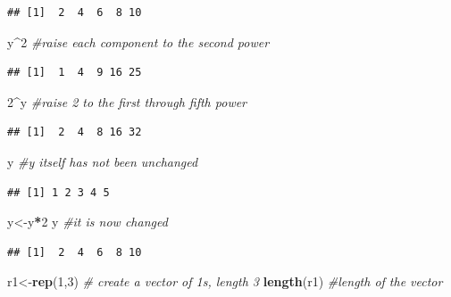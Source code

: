 \documentclass[12pt,]{krantz}
\newenvironment{Shaded}{\begin{snugshade}}{\end{snugshade}}
\newcommand{\CommentTok}[1]{\textcolor[rgb]{0.56,0.35,0.01}{\textit{#1}}}
\newcommand{\DecValTok}[1]{\textcolor[rgb]{0.00,0.00,0.81}{#1}}
\newcommand{\KeywordTok}[1]{\textcolor[rgb]{0.13,0.29,0.53}{\textbf{#1}}}
\newcommand{\NormalTok}[1]{#1}
\newcommand{\OperatorTok}[1]{\textcolor[rgb]{0.81,0.36,0.00}{\textbf{#1}}}
\begin{document}
\begin{verbatim}
## [1]  2  4  6  8 10
\end{verbatim}

\begin{Shaded}
\begin{Highlighting}[]
\NormalTok{y}\OperatorTok{^}\DecValTok{2}                 \CommentTok{#raise each component to the second power}
\end{Highlighting}
\end{Shaded}

\begin{verbatim}
## [1]  1  4  9 16 25
\end{verbatim}

\begin{Shaded}
\begin{Highlighting}[]
\DecValTok{2}\OperatorTok{^}\NormalTok{y                 }\CommentTok{#raise 2 to the first through fifth power}
\end{Highlighting}
\end{Shaded}

\begin{verbatim}
## [1]  2  4  8 16 32
\end{verbatim}

\begin{Shaded}
\begin{Highlighting}[]
\NormalTok{y                   }\CommentTok{#y itself has not been unchanged}
\end{Highlighting}
\end{Shaded}

\begin{verbatim}
## [1] 1 2 3 4 5
\end{verbatim}

\begin{Shaded}
\begin{Highlighting}[]
\NormalTok{y<-y}\OperatorTok{*}\DecValTok{2}
\NormalTok{y                   }\CommentTok{#it is now changed}
\end{Highlighting}
\end{Shaded}

\begin{verbatim}
## [1]  2  4  6  8 10
\end{verbatim}

\begin{Shaded}
\begin{Highlighting}[]
\NormalTok{r1<-}\KeywordTok{rep}\NormalTok{(}\DecValTok{1}\NormalTok{,}\DecValTok{3}\NormalTok{)        }\CommentTok{# create a vector of 1s, length 3}
\KeywordTok{length}\NormalTok{(r1)           }\CommentTok{#length of the vector}
\end{Highlighting}
\end{Shaded}
\end{document}
